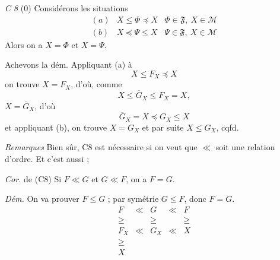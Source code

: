 \documentclass[11pt,a4paper]{article}
\begin{document}
\emph{C 8} (0) \quad Considérons les situations
\[
  \begin{array}{lll}
    (a) & X \leq \Phi \preccurlyeq X & \Phi \in \mathfrak{F},\ X \in \mathcal{M} \\
    (b) & X \preccurlyeq \Psi \leq X & \Psi \in \mathfrak{F},\ X \in \mathcal{M}
  \end{array}
\]
 Alors on a $X = \Phi$ et $X = \Psi$.

Achevons la dém. Appliquant (a) à
\[
  X \leq F_X \preccurlyeq X
\]
on trouve $X = F_X$, d'où, comme
\[
  X \leq \overline{G}_X \leq F_X = X ,
\]
$X = \overline{G}_X$, d'où
\[
  \overline{G}_X = X \preccurlyeq G_X \leq X
\]
et appliquant (b), on trouve $X = G_X$ et par suite $X \leq G_X$, cqfd.

\emph{Remarques} \quad Bien sûr, C8 est nécessaire si on veut que $\ll$ soit une relation d'ordre. Et c'est aussi  ;

\emph{Cor.} de (C8)  \quad Si $F \ll G$ et $G \ll F$, on a $F = G$.

\emph{Dém.} \quad {} On va prouver $F \leq G$ ;   par symétrie $G \leq F$, donc $F = G$. 
\[
  \begin{array}{ccccc}
    F & \ll & G & \ll & F \\
    \geq & & \geq & & \geq \\
    F_X & \ll & G_X & \ll & X \\
    \geq & & & & \\
    X & & & &
  \end{array}
\]
\end{document}
